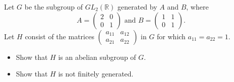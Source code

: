 Let \(G\) be the subgroup of \(GL_{2}(\mathbb{R})\) generated by \(A\) and \(B\), where
\[A=\begin{pmatrix} 2 &0\\ 0&1 \end{pmatrix} \text{ and } B=\begin{pmatrix} 1 &1\\ 0&1 \end{pmatrix}.\]
Let \(H\) consist of the matrices \(\begin{pmatrix} a_{11} &a_{12}\\ a_{21}& a_{22} \end{pmatrix}\) in \(G\) for which \(a_{11}=a_{22}=1\).
\begin{itemize}
    \item[(a)] Show that \(H\) is an abelian subgroup of \(G\).
    \item[(b)] Show that \(H\) is not finitely generated.
\end{itemize}